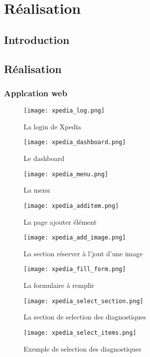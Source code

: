 \chapter{Réalisation}

\section*{Introduction}

\section{Réalisation}
\subsection{Applcation web}
\begin{figure}[H]
    \centering
    \texttt{[image: xpedia\_log.png]}
    \caption{La login de Xpedia}\label{fig:xpedia_log}
\end{figure}
\begin{figure}[H]
    \centering
    \texttt{[image: xpedia\_dashboard.png]}
    \caption{Le dashboard}\label{fig:xpedia_dashboard}
\end{figure}
\begin{figure}[H]
    \centering
    \texttt{[image: xpedia\_menu.png]}
    \caption{La menu}\label{fig:xpedia_menu}
\end{figure}
\begin{figure}[H]
    \centering
    \texttt{[image: xpedia\_additem.png]}
    \caption{La page ajouter élément}\label{fig:xpedia_additem}
\end{figure}
\begin{figure}[H]
    \centering
    \texttt{[image: xpedia\_add\_image.png]}
    \caption{La section réserver à l'jout d'une image}\label{fig:xpedia_add_image}
\end{figure}
\begin{figure}[H]
    \centering
    \texttt{[image: xpedia\_fill\_form.png]}
    \caption{La formulaire à remplir}\label{fig:xpedia_fill_form}
\end{figure}
\begin{figure}[H]
    \centering
    \texttt{[image: xpedia\_select\_section.png]}
    \caption{La section de selection des diagnostiques}\label{fig:xpedia_select_section}
\end{figure}
\begin{figure}[H]
    \centering
    \texttt{[image: xpedia\_select\_items.png]}
    \caption{Exemple de selection des diagnostiques}\label{fig:xpedia_select_items}
\end{figure}
